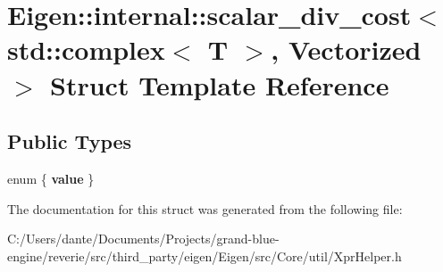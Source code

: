 \hypertarget{struct_eigen_1_1internal_1_1scalar__div__cost_3_01std_1_1complex_3_01_t_01_4_00_01_vectorized_01_4}{}\section{Eigen\+::internal\+::scalar\+\_\+div\+\_\+cost$<$ std\+::complex$<$ T $>$, Vectorized $>$ Struct Template Reference}
\label{struct_eigen_1_1internal_1_1scalar__div__cost_3_01std_1_1complex_3_01_t_01_4_00_01_vectorized_01_4}
\subsection*{Public Types}
\begin{DoxyCompactItemize}
\item 
\mbox{\label{struct_eigen_1_1internal_1_1scalar__div__cost_3_01std_1_1complex_3_01_t_01_4_00_01_vectorized_01_4_a5063a9c9c816555d8cf8531b7f5608b1}} 
enum \{ {\bfseries value}
 \}
\end{DoxyCompactItemize}


The documentation for this struct was generated from the following file\+:\begin{DoxyCompactItemize}
\item 
C\+:/\+Users/dante/\+Documents/\+Projects/grand-\/blue-\/engine/reverie/src/third\+\_\+party/eigen/\+Eigen/src/\+Core/util/Xpr\+Helper.\+h\end{DoxyCompactItemize}
